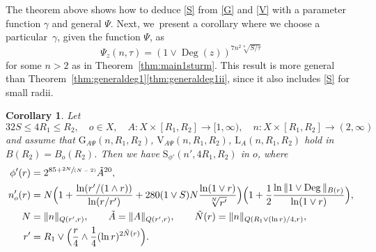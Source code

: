 \documentclass[JEP,XML,SOM,Unicode,published]{cedram}
\newcommand{\spfrac}[2]{\sfrac{#1}{(#2)}}
\newcommand{\rG}{\mathrm{G}}
\newcommand{\rS}{\mathrm{S}}
\newcommand{\rV}{\mathrm{V}}
\newcommand{\rL}{\mathrm{L}}
\theoremstyle{plain}
\newtheorem{corollary}[theorem]{Corollary}
\theoremstyle{definition}
\DeclareMathOperator{\Deg}{Deg}
\begin{document}
The theorem above shows how to deduce \eqref{S} from \eqref{G} and \eqref{V} with a parameter function $\gamma$ and general $\Psi$. Next, we~present a corollary where we choose a particular~$\gamma$, given the function $\Psi$, as
\[
\Psi_z(n,\tau)=\left(1\vee \Deg(z)
\right)^{7n^2\sqrt[n]{S/\tau}}
\]
for some $n>2$ as in Theorem~\ref{thm:main1sturm}. This result is more general than Theorem~\ref{thm:generaldeg1}\eqref{thm:generaldeg1ii}, since it also includes \eqref{S} for small radii.
\begin{corollary}\label{cor:sobolevall}
Let
\[
32S\leq {4} R_1\leq R_2,\quad o\in X,\quad A\colon X\times [R_1,R_2]\to[1,\infty),\quad {n}\colon X\times [R_1,R_2]\to(2,\infty)
\]
and assume that $\rG_{A\Psi}(n,R_1,R_2)$, $\rV_{\!A\Psi} (n,R_1,R_2)$, $\rL_A(n,R_1,R_2)$ hold in $B(R_2)=B_{o}(R_{2})$.
Then we have $\rS_{\phi'}(n',{4} R_1,R_2)$ in $o$, where
\begin{align*}
\phi'(r)&= 2^{85+\spfrac{2 N}{N-2}}\tilde A^{20},
\\
n_o'(r)&=
N \Bigl(1+\frac{\ln(r'/(1\wedge r))}{\ln(r/r')} +{28
0 (1\vee S) N{\frac{\ln (1\vee r)}{\sqrt[ N]{r'}}}}\Bigr)\Bigl(1+ \frac{1}{2}\frac{\ln\Vert 1\vee \Deg\Vert_{B(r)}} {\ln(1\vee r)}\Bigl),
\\
N&= \Vert n\Vert_{Q(r',r)},\qquad \tilde A= \Vert A\Vert_{Q(r',r)},\qquad \tilde N(r)=\|n\|_{Q(R_1\vee (\ln r)/4,r)},
\\
r'&= R_1\vee\Bigl( \frac{r}{4}\wedge \frac{1}{4}(\ln r)^{2\tilde N(r)}\Bigr).
\end{align*}
\end{corollary}
\end{document}
